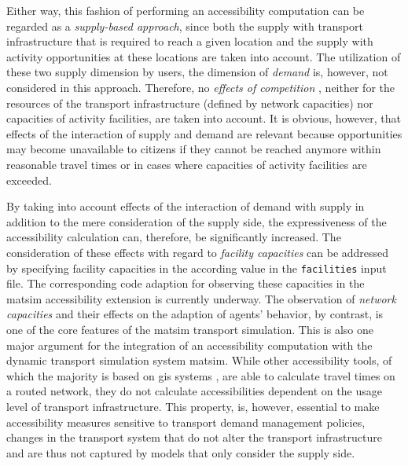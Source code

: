 
Either way, this fashion of performing an accessibility computation can be regarded as a \emph{supply-based approach}, 
since both the supply with transport infrastructure that is required to reach a given location and the supply with 
activity opportunities at these locations are taken into account. The utilization of these two supply dimension by users, 
\ie the dimension of \emph{demand} is, however, not considered in this approach. Therefore, no 
\emph{effects of competition} \citep{Geurs2004AccessibilityReview}, neither for the resources of the transport 
infrastructure (defined by network capacities) nor capacities of activity facilities, are taken into account. It is 
obvious, however, that effects of the interaction of supply and demand are relevant because opportunities may become 
unavailable to citizens if they cannot be reached anymore within reasonable travel times or in cases where capacities 
of activity facilities are exceeded. 

By taking into account effects of the interaction of demand with supply in addition to the mere consideration of the
supply side, the expressiveness of the accessibility calculation can, therefore, be significantly increased. The
consideration of these effects with regard to \emph{facility capacities} can be addressed by specifying facility
capacities in the according value in the \lstinline{facilities} input file. The corresponding code adaption for
observing these capacities in the \gls{matsim} accessibility extension is currently underway. The observation of
\emph{network capacities} and their effects on the adaption of agents' behavior, by contrast, is one of the core features
of the \gls{matsim} transport simulation. This is also one major argument for the integration of an accessibility
computation with the dynamic transport simulation system \gls{matsim}. While other accessibility tools, of which the
majority is based on \gls{gis} systems
\citep{BBSRErreichbarkeitsmodell, CurtisEtAl2013AccessibilityPolicyInnovation, BuettnerEtAl2010Erreichbarkeitsatlas, LiuZhu2004AccessibilityAnalyst, GulhanEtAl2014PotentialAccessibilityMeasureDenizli}
, are able to calculate travel times on a routed network, they do not calculate accessibilities dependent on the usage
level of transport infrastructure. This property, is, however, essential to make accessibility measures sensitive to
transport demand management policies, \ie changes in the transport system that do not alter the transport
infrastructure and are thus not captured by models that only consider the supply side.

